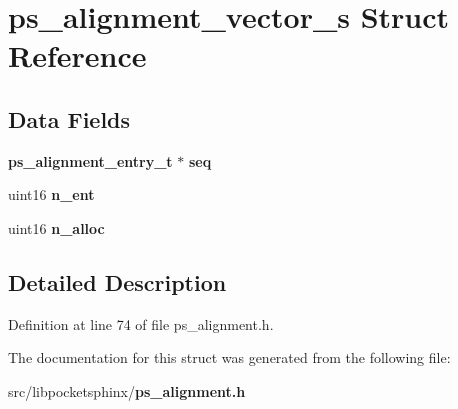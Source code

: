 \section{ps\-\_\-alignment\-\_\-vector\-\_\-s Struct Reference}
\label{structps__alignment__vector__s}
\subsection*{Data Fields}
\begin{DoxyCompactItemize}
\item 
{\bf ps\-\_\-alignment\-\_\-entry\-\_\-t} $\ast$ {\bfseries seq}\label{structps__alignment__vector__s_a5bfae302b7ca4bddde35600d157bc2a2}

\item 
uint16 {\bfseries n\-\_\-ent}\label{structps__alignment__vector__s_ac45b2f21982334d415bed78abfeba66d}

\item 
uint16 {\bfseries n\-\_\-alloc}\label{structps__alignment__vector__s_a18d4510d8a2495ac96bb0c295b725c83}

\end{DoxyCompactItemize}


\subsection{Detailed Description}


Definition at line 74 of file ps\-\_\-alignment.\-h.



The documentation for this struct was generated from the following file\-:\begin{DoxyCompactItemize}
\item 
src/libpocketsphinx/{\bf ps\-\_\-alignment.\-h}\end{DoxyCompactItemize}
